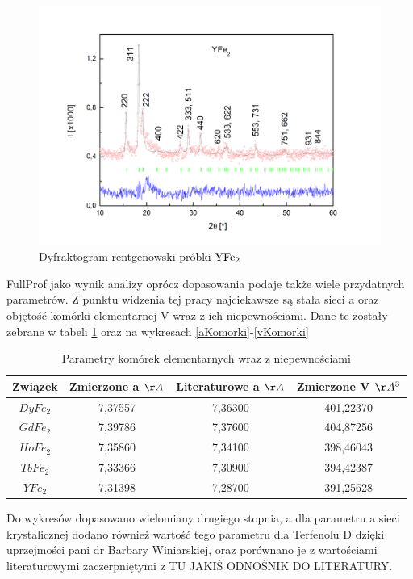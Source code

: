 \documentclass[a4paper,12pt]{article}
\numberwithin{equation}{section}
\newcommand{\nit}[1]{\textnormal{#1}}
\begin{document}
\newpage
\begin{figure}
  \centering
  \includegraphics[width=0.85\linewidth]{../img/dif/YFe2rentgen}
  \caption{Dyfraktogram rentgenowski próbki $\nit{Y}\nit{Fe}_2$}
  \label{Yrentgen}
\end{figure}

\restoregeometry
{}

FullProf jako wynik analizy oprócz dopasowania podaje także wiele przydatnych parametrów. Z punktu widzenia tej pracy najciekawsze są stała sieci a oraz objętość komórki elementarnej V wraz z ich niepewnościami. Dane te zostały zebrane w tabeli \ref{parKomTab} 
oraz na wykresach \ref{aKomorki}-\ref{vKomorki}


\begin{table}[!ht]
  \centering
  \caption{Parametry komórek elementarnych wraz z niepewnościami}
  \label{parKomTab}
  \begin{tabular}{|c|c|c|c|}
    \hline
Związek	&	Zmierzone a $\AA$	&	Literaturowe a $\AA$	&	Zmierzone V $\AA^3$	\\\hline
$DyFe_2$	&	7,37557	&	7,36300	&	401,22370	\\\hline
$GdFe_2$	&	7,39786	&	7,37600	&	404,87256	\\\hline
$HoFe_2$	&	7,35860	&	7,34100	&	398,46043	\\\hline
$TbFe_2$	&	7,33366	&	7,30900	&	394,42387	\\\hline
$YFe_2$	&	7,31398	&	7,28700	&	391,25628	\\\hline

  \end{tabular}
\end{table}

Do wykresów dopasowano wielomiany drugiego stopnia, a dla parametru a sieci krystalicznej dodano również wartość tego parametru dla Terfenolu D dzięki uprzejmości pani dr Barbary Winiarskiej, oraz porównano je z wartościami literaturowymi zaczerpniętymi z TU JAKIŚ ODNOŚNIK DO LITERATURY.
\end{document}
